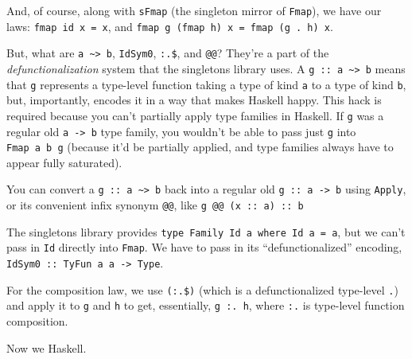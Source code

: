 \documentclass[]{article}
\begin{document}
And, of course, along with \texttt{sFmap} (the singleton mirror of
\texttt{Fmap}), we have our laws: \texttt{fmap\ id\ x\ =\ x}, and
\texttt{fmap\ g\ (fmap\ h)\ x\ =\ fmap\ (g\ .\ h)\ x}.

But, what are \texttt{a\ \textasciitilde{}\textgreater{}\ b}, \texttt{IdSym0},
\texttt{:.\$}, and \texttt{@@}? They're a part of the \emph{defunctionalization}
system that the singletons library uses. A
\texttt{g\ ::\ a\ \textasciitilde{}\textgreater{}\ b} means that \texttt{g}
represents a type-level function taking a type of kind \texttt{a} to a type of
kind \texttt{b}, but, importantly, encodes it in a way that makes Haskell happy.
This hack is required because you can't partially apply type families in
Haskell. If \texttt{g} was a regular old \texttt{a\ -\textgreater{}\ b} type
family, you wouldn't be able to pass just \texttt{g} into \texttt{Fmap\ a\ b\ g}
(because it'd be partially applied, and type families always have to appear
fully saturated).

You can convert a \texttt{g\ ::\ a\ \textasciitilde{}\textgreater{}\ b} back
into a regular old \texttt{g\ ::\ a\ -\textgreater{}\ b} using \texttt{Apply},
or its convenient infix synonym \texttt{@@}, like
\texttt{g\ @@\ (x\ ::\ a)\ ::\ b}

The singletons library provides
\texttt{type\ Family\ Id\ a\ where\ Id\ a\ =\ a}, but we can't pass in
\texttt{Id} directly into \texttt{Fmap}. We have to pass in its
``defunctionalized'' encoding,
\texttt{IdSym0\ ::\ TyFun\ a\ a\ -\textgreater{}\ Type}.

For the composition law, we use \texttt{(:.\$)} (which is a defunctionalized
type-level \texttt{.}) and apply it to \texttt{g} and \texttt{h} to get,
essentially, \texttt{g\ :.\ h}, where \texttt{:.} is type-level function
composition.

Now we Haskell.
\end{document}
